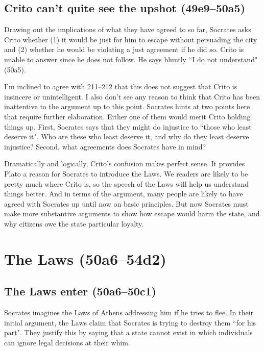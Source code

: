 \documentclass[12pt,letterpaper]{article}
\begin{document}
\subsection*{Crito can't quite see the upshot (49e9--50a5)}

Drawing out the implications of what they have agreed to so far, Socrates
asks Crito whether (1) it would be just for him to escape without
persuading the city and (2) whether he would be violating a just agreement
if he did so. Crito is unable to answer since he does not follow. He says
bluntly ``I do not understand" (50a5).

I'm inclined to agree with \cite{brickhouse-smith2004-plato-trial-of-socrates} 211--212 that this does
not suggest that Crito is insincere or unintelligent. I also don't see any
reason to think that Crito has been inattentive to the argument up to this
point. Socrates hints at two points here that require further elaboration.
Either one of them would merit Crito holding things up. First, Socrates
says that they might do injustice to ``those who least deserve it". Who are
these who least deserve it, and why do they least deserve injustice?
Second, what agreements does Socrates have in mind?

Dramatically and logically, Crito's confusion makes perfect sense. It
provides Plato a reason for Socrates to introduce the Laws. We readers are
likely to be pretty much where Crito is, so the speech of the Laws will
help us understand things better. And in terms of the argument, many
people are likely to have agreed with Socrates up until now on basic
principles. But now Socrates must make more substantive arguments to show
how escape would harm the state, and why citizens owe the state particular
loyalty.



\section*{The Laws (50a6--54d2)}

\subsection*{The Laws enter (50a6--50c1)}

Socrates imagines the Laws of Athens addressing him if he tries to flee. In their initial argument, the Laws claim that Socrates is trying to destroy them ``for his part". They justify this by saying that a state cannot exist in which individuals can ignore legal decisions at their whim.
\end{document}
